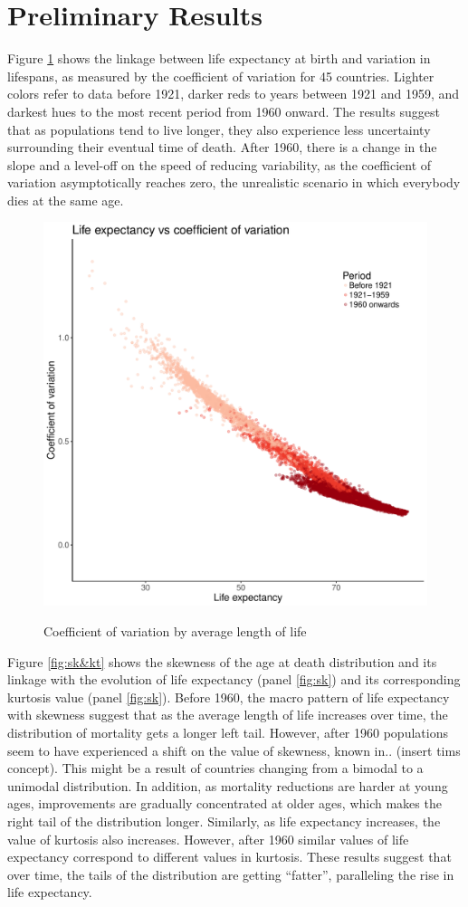 \documentclass{article}
\begin{document}
\FloatBarrier
\section*{Preliminary Results}
Figure \ref{fig:CV} shows the linkage between life expectancy at birth and  variation in lifespans, as measured by the coefficient of variation for 45 countries. Lighter colors refer to data before 1921, darker reds to years between 1921 and 1959, and darkest hues to the most recent period from 1960 onward. The results suggest that as populations tend to live longer, they also experience less uncertainty surrounding their eventual time of death. After 1960, there is a change in the slope and a level-off on the speed of reducing variability, as the coefficient of variation asymptotically reaches zero, the unrealistic scenario in which everybody dies at the same age.
\begin{figure}
\caption{Coefficient of variation by average length of life}
\centering
\includegraphics[width=.3\textwidth]{Figures/Figure_CV}
\label{fig:CV}
\end{figure}

Figure \ref{fig:sk&kt} shows the skewness of the age at death distribution and its linkage with the evolution of life expectancy (panel \ref{fig:sk}) and its corresponding kurtosis value (panel \ref{fig:sk}). Before 1960, the macro pattern of life expectancy with skewness suggest that as the average length of life increases over time, the distribution of mortality gets a longer left tail. However, after 1960 populations seem to have experienced a shift on the value of skewness, known in.. (insert tims concept). This might be a result of countries changing from a bimodal to a unimodal distribution. In addition, as mortality reductions are harder at young ages, improvements are gradually concentrated at older ages, which makes the right tail of the distribution longer. Similarly, as life expectancy increases, the value of kurtosis also increases. However, after 1960 similar values of life expectancy correspond to different values in kurtosis. These results suggest that over time, the tails of the distribution are getting ``fatter'', paralleling the rise in life expectancy. 
\end{document}
